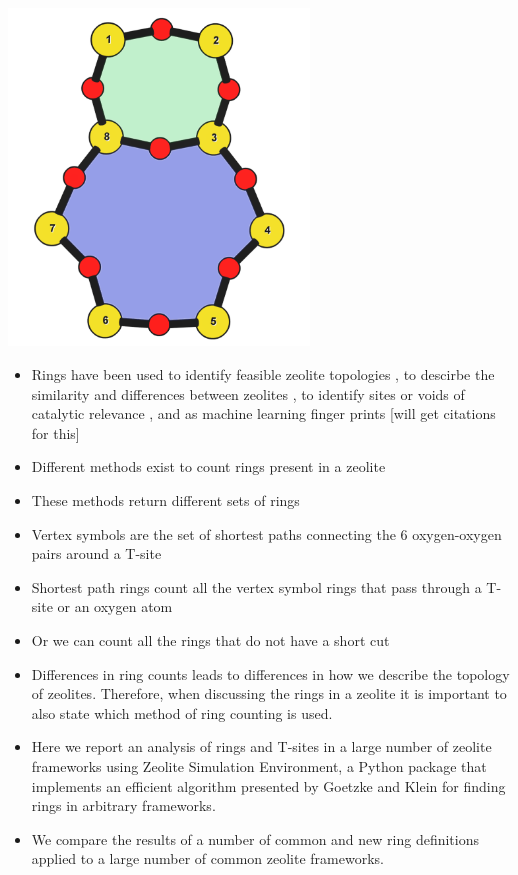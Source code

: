\documentclass[11pt]{article}
\begin{document}
\begin{center}
\includegraphics[width=0.60\textwidth]{../figures/cha-labeled.pdf}
\end{center}

\begin{itemize}
\item Rings have been used to identify feasible zeolite topologies \cite{li-why-2014}, to descirbe the similarity and differences between zeolites \cite{curtis-statistical-2003}, to identify sites or voids of catalytic relevance \cite{li-first-principles-2018,kester-effects-2021}, and as machine learning finger prints [will get citations for this]

\item Different methods exist to count rings present in a zeolite
\item These methods return different sets of rings
\item Vertex symbols are the set of shortest paths connecting the 6 oxygen-oxygen pairs around a T-site \cite{okeeffe-vertex-1997}
\item Shortest path rings count all the vertex symbol rings that pass through a T-site or an oxygen atom \cite{sastre-topological-2009}
\item Or we can count all the rings that do not have a short cut \cite{goetzke-properties-1991}
\item Differences in ring counts leads to differences in how we describe the topology of zeolites. Therefore, when discussing the rings in a zeolite it is important to also state which method of ring counting is used.
\item Here we report an analysis of rings and T-sites in a large number of zeolite frameworks using Zeolite Simulation Environment, a Python package that implements an efficient algorithm presented by Goetzke and Klein \cite{goetzke-properties-1991} for finding rings in arbitrary frameworks.
\item We compare the results of a number of common and new ring definitions applied to a large number of common zeolite frameworks.\cite{li-first-principles-2018}
\end{itemize}
\end{document}
